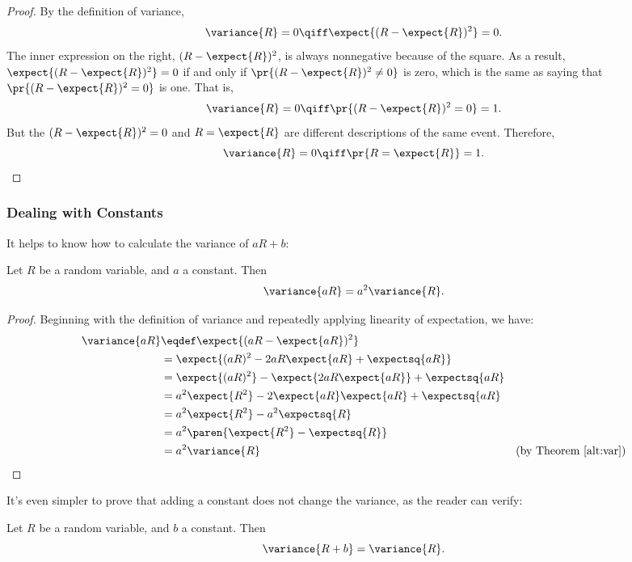 \begin{proof}
By the definition of variance,
\[
\variance{R} = 0\qiff \expect{(R - \expect{R})^2} = 0.
\]
The inner expression on the right, $(R - \expect{R})^2$, is always
nonnegative because of the square.  As a result, $\expect{(R -
\expect{R})^2} = 0$ if and only if $\pr{(R - \expect{R})^2 \neq 0}$ is
zero, which is the same as saying that $\pr{(R - \expect{R})^2 = 0}$ is
one.  That is,
\[
\variance{R} = 0 \qiff \pr{(R - \expect{R})^2 = 0} = 1.
\]
But the $(R - \expect{R})^2 = 0$ and $R = \expect{R}$ are different
descriptions of the same event.  Therefore,
\[
\variance{R} = 0 \qiff \pr{R = \expect{R}} =1.
\]
\end{proof}
\fi

\subsubsection{Dealing with Constants}

It helps to know how to calculate the variance of $aR+b$:

\begin{theorem}\label{var.const}
Let $R$ be a random variable, and $a$ a constant. Then
\begin{equation}\label{a2R}
\variance{a R} = a^2 \variance{R}.
\end{equation}
\end{theorem}

\begin{proof}
Beginning with the definition of variance and repeatedly applying
linearity of expectation, we have:
\begin{align*}
\variance{aR}
    & \eqdef \expect{(aR-\expect{aR})^2}\\
    & = \expect{(aR)^2 -2aR\expect{aR} + \expectsq{aR}}\\
    & = \expect{(aR)^2} -\expect{2aR\expect{aR}} + \expectsq{aR}\\
    & = a^2\expect{R^2} -2\expect{aR}\expect{aR} + \expectsq{aR}\\
    & = a^2\expect{R^2} -a^2\expectsq{R}\\
    & = a^2\paren{\expect{R^2} - \expectsq{R}}\\
    & = a^2\variance{R} & \text{(by Theorem~\ref{alt:var})}
\end{align*}
\end{proof}

It's even simpler to prove that adding a constant does not change the
variance, as the reader can verify:
\begin{theorem}\label{var+const}
Let $R$ be a random variable, and $b$ a constant. Then
\begin{equation}\label{R+b}
\variance{R+b} = \variance{R}.
\end{equation}
\end{theorem}

